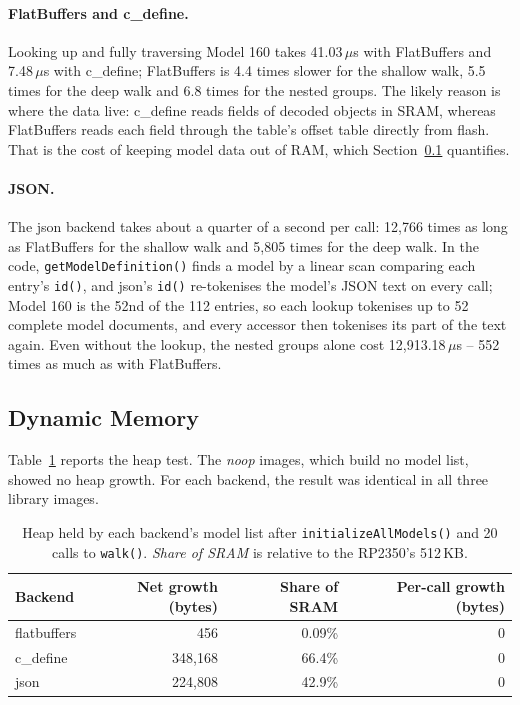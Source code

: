\documentclass{article}
\begin{document}
\paragraph{FlatBuffers and c\_define.} Looking up and fully traversing Model 160 takes 41.03\,$\mu$s with FlatBuffers and 7.48\,$\mu$s with c\_define; FlatBuffers is 4.4 times slower for the shallow walk, 5.5 times for the deep walk and 6.8 times for the nested groups. The likely reason is where the data live: c\_define reads fields of decoded objects in SRAM, whereas FlatBuffers reads each field through the table's offset table directly from flash. That is the cost of keeping model data out of RAM, which Section~\ref{sec:heap} quantifies.

\paragraph{JSON.} The json backend takes about a quarter of a second per call: 12{,}766 times as long as FlatBuffers for the shallow walk and 5{,}805 times for the deep walk. In the code, \texttt{getModelDefinition()} finds a model by a linear scan comparing each entry's \texttt{id()}, and json's \texttt{id()} re-tokenises the model's JSON text on every call; Model 160 is the 52nd of the 112 entries, so each lookup tokenises up to 52 complete model documents, and every accessor then tokenises its part of the text again. Even without the lookup, the nested groups alone cost 12{,}913.18\,$\mu$s -- 552 times as much as with FlatBuffers.

\subsection{Dynamic Memory}
\label{sec:heap}
Table~\ref{tab:heap} reports the heap test. The \textit{noop} images, which build no model list, showed no heap growth. For each backend, the result was identical in all three library images.

\begin{table}[h]
\centering
\begin{tabular}{|l|r|r|r|}
\hline
\textbf{Backend} & \textbf{Net growth (bytes)} & \textbf{Share of SRAM} & \textbf{Per-call growth (bytes)} \\
\hline
flatbuffers & 456         & 0.09\% & 0 \\
c\_define   & 348{,}168   & 66.4\% & 0 \\
json        & 224{,}808   & 42.9\% & 0 \\
\hline
\end{tabular}
\caption{Heap held by each backend's model list after \texttt{initializeAllModels()} and 20 calls to \texttt{walk()}. \textit{Share of SRAM} is relative to the RP2350's 512\,KB.}
\label{tab:heap}
\end{table}
\end{document}
